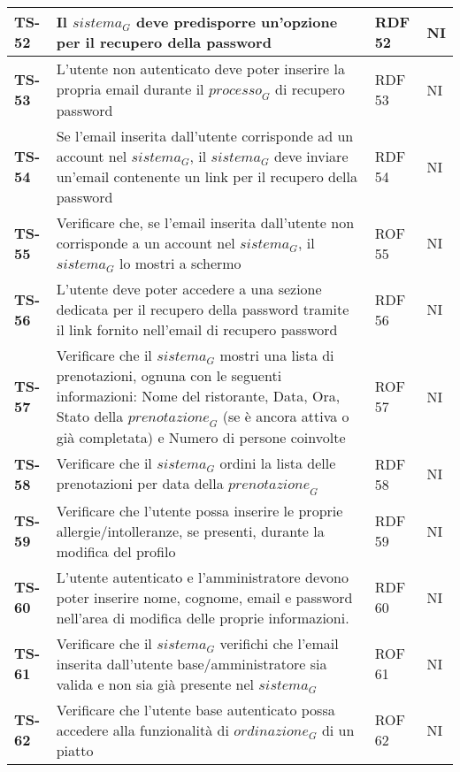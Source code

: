 \begin{longtable}{|>{\centering\arraybackslash}p{1.5cm}|p{12cm}|p{2cm}|p{1cm}|}
  \hline
  \rowcolor{gray!10}
  \textbf{TS-52} & Il $\textit{sistema}_G$ deve predisporre un’opzione per il recupero della password & RDF 52 & NI \\ 
  \hline
  \rowcolor{gray!10}
  \textbf{TS-53} & L’utente non autenticato deve poter inserire la propria email durante il $\textit{processo}_G$ di recupero password & RDF 53 & NI \\ 
  \hline
  \rowcolor{gray!10}
  \textbf{TS-54} & Se l’email inserita dall’utente corrisponde ad un account nel $\textit{sistema}_G$, il $\textit{sistema}_G$ deve inviare un’email contenente un link per il recupero della password & RDF 54 & NI \\
  \hline
  \rowcolor{gray!10}
  \textbf{TS-55} & Verificare che, se l'email inserita dall'utente non corrisponde a un account nel $\textit{sistema}_G$, il $\textit{sistema}_G$ lo mostri a schermo & ROF 55 & NI \\ 
  \hline
  \rowcolor{gray!10}
  \textbf{TS-56} & L’utente deve poter accedere a una sezione dedicata per il recupero della password tramite il link fornito nell’email di recupero password & RDF 56 & NI \\ 
  \hline
  \rowcolor{gray!10}
  \textbf{TS-57} & Verificare che il $\textit{sistema}_G$ mostri una lista di prenotazioni, ognuna con le seguenti informazioni:
  Nome del ristorante, Data, Ora, Stato della $\textit{prenotazione}_G$ (se è ancora attiva o già completata) e Numero di persone coinvolte & ROF 57 & NI \\
  \hline
  \rowcolor{gray!10}
  \textbf{TS-58} & Verificare che il $\textit{sistema}_G$ ordini la lista delle prenotazioni per data della $\textit{prenotazione}_G$ & RDF 58 & NI \\ 
  \hline
  \rowcolor{gray!10}
  \textbf{TS-59} & Verificare che l'utente possa inserire le proprie allergie/intolleranze, se presenti, durante la modifica del profilo & RDF 59 & NI \\ 
  \hline
  \rowcolor{gray!10}
  \textbf{TS-60} & L’utente autenticato e l’amministratore devono poter inserire nome, cognome, email e password nell’area di modifica delle proprie informazioni. & RDF 60 & NI \\ 
  \hline
  \rowcolor{gray!10}
  \textbf{TS-61} & Verificare che il $\textit{sistema}_G$ verifichi che l'email inserita dall'utente base/amministratore sia valida e non sia già presente nel $\textit{sistema}_G$ & ROF 61 & NI \\ 
  \hline
  \rowcolor{gray!10}
  \textbf{TS-62} & Verificare che l'utente base autenticato possa accedere alla funzionalità di $\textit{ordinazione}_G$ di un piatto & ROF 62 & NI \\

\end{longtable}
